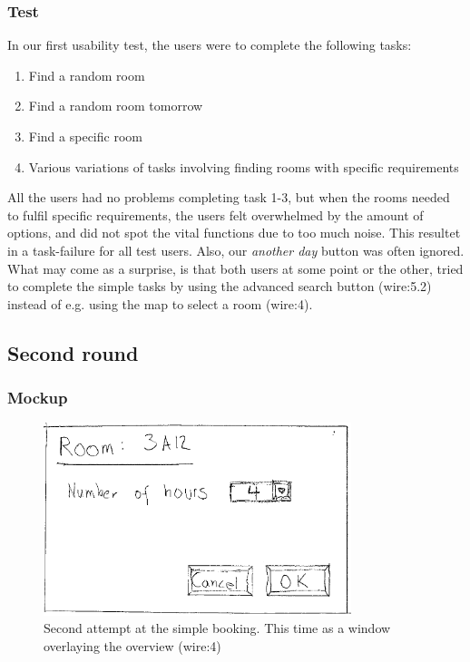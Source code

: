 \subsubsection{Test}
\label{mock1:test}
In our first usability test, the users were to complete the following tasks:

\begin{enumerate}
	\item Find a random room
	\item Find a random room tomorrow
	\item Find a specific room
	\item Various variations of tasks involving finding rooms with specific requirements
\end{enumerate}

All the users had no problems completing task 1-3, but when the rooms needed to fulfil specific requirements, the  users felt overwhelmed by the amount of options, and did not spot the vital functions due to too much noise. This resultet in a task-failure for all test users. Also, our \emph{another day} button was often ignored. \\

What may come as a surprise, is that both users at some point or the other, tried to complete the simple tasks by using the advanced search button (wire:5.2) instead of e.g. using the map to select a room (wire:4). \\
\pagebreak


\subsection{Second round}
\subsubsection{Mockup}
\begin{figure}[htb]
\begin{center}
\leavevmode
\includegraphics[width=0.8\textwidth]{images/bookRoomMockup2}
\end{center}
\caption{Second attempt at the simple booking. This time as a window overlaying the overview (wire:4)}
\label{fig:book_room_mockup2}
\end{figure}

